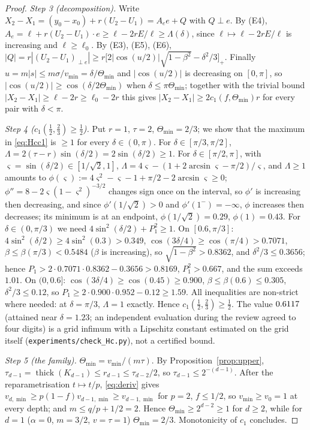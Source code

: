 \documentclass[10pt,a4paper]{article}
\theoremstyle{plain}
\theoremstyle{definition}
\theoremstyle{remark}
\newcommand{\thick}{\operatorname{thick}}
\begin{document}
\begin{proof}
\emph{Step 3 (decomposition).} Write $X_2-X_1=(y_0-x_0)+r(U_2-U_1)=A_ee+Q$ with $Q\perp e$. By (E4), $A_e=\ell+r(U_2-U_1)\cdot e\ge\ell-2rE/\ell\ge\Lambda(\delta)$, since $\ell\mapsto\ell-2rE/\ell$ is increasing and $\ell\ge\ell_0$. By (E3), (E5), (E6), $|Q|=r|(U_2-U_1)_{\perp e}|\ge r\bigl[2|\cos(u/2)|\sqrt{1-\beta^2}-\delta^2/3\bigr]_+$. Finally $u=m|s|\le m\sigma/v_{\min}=\delta/\Theta_{\min}$ and $|\cos(u/2)|$ is decreasing on $[0,\pi]$, so $|\cos(u/2)|\ge\cos(\delta/2\Theta_{\min})$ when $\delta\le\pi\Theta_{\min}$; together with the trivial bound $|X_2-X_1|\ge\ell-2r\ge\ell_0-2r$ this gives $|X_2-X_1|\ge2c_1(f,\Theta_{\min})r$ for every pair with $\delta<\pi$.

\emph{Step 4 ($c_1(\frac12,\frac23)\ge\frac12$).} Put $r=1$, $\tau=2$, $\Theta_{\min}=2/3$; we show that the maximum in \eqref{eq:Hcc1} is $\ge1$ for every $\delta\in(0,\pi)$. For $\delta\in[\pi/3,\pi/2]$, $\Lambda=2(\tau-r)\sin(\delta/2)=2\sin(\delta/2)\ge1$. For $\delta\in[\pi/2,\pi]$, with $\varsigma=\sin(\delta/2)\in[1/\sqrt2,1]$, $\Lambda=4\varsigma-(1+2\arcsin\varsigma-\pi/2)/\varsigma$, and $\Lambda\ge1$ amounts to $\phi(\varsigma):=4\varsigma^2-\varsigma-1+\pi/2-2\arcsin\varsigma\ge0$; $\phi''=8-2\varsigma(1-\varsigma^2)^{-3/2}$ changes sign once on the interval, so $\phi'$ is increasing then decreasing, and since $\phi'(1/\sqrt2)>0$ and $\phi'(1^-)=-\infty$, $\phi$ increases then decreases; its minimum is at an endpoint, $\phi(1/\sqrt2)=0.29$, $\phi(1)=0.43$. For $\delta\in(0,\pi/3)$ we need $4\sin^2(\delta/2)+P_1^2\ge1$. On $[0.6,\pi/3]$: $4\sin^2(\delta/2)\ge4\sin^2(0.3)>0.349$, $\cos(3\delta/4)\ge\cos(\pi/4)>0.7071$, $\beta\le\beta(\pi/3)<0.5484$ ($\beta$ is increasing), so $\sqrt{1-\beta^2}>0.8362$, and $\delta^2/3\le0.3656$; hence $P_1>2\cdot0.7071\cdot0.8362-0.3656>0.8169$, $P_1^2>0.667$, and the sum exceeds $1.01$. On $(0,0.6]$: $\cos(3\delta/4)\ge\cos(0.45)\ge0.900$, $\beta\le\beta(0.6)\le0.305$, $\delta^2/3\le0.12$, so $P_1\ge2\cdot0.900\cdot0.952-0.12\ge1.59$. All inequalities are non-strict where needed: at $\delta=\pi/3$, $\Lambda=1$ exactly. Hence $c_1(\frac12,\frac23)\ge\frac12$. The value $0.6117$ (attained near $\delta=1.23$; an independent evaluation during the review agreed to four digits) is a grid infimum with a Lipschitz constant estimated on the grid itself (\texttt{experiments/check\_Hc.py}), not a certified bound.

\emph{Step 5 (the family).} $\Theta_{\min}=v_{\min}/(m\tau)$. By Proposition~\ref{prop:upper}, $\tau_{d-1}=\thick(K_{d-1})\le r_{d-1}\le\tau_{d-2}/2$, so $\tau_{d-1}\le2^{-(d-1)}$. After the reparametrisation $t\mapsto t/p$, \eqref{eq:deriv} gives $v_{d,\min}\ge p(1-f)v_{d-1,\min}\ge v_{d-1,\min}$ for $p=2$, $f\le1/2$, so $v_{\min}\ge v_0=1$ at every depth; and $m\le q/p+1/2=2$. Hence $\Theta_{\min}\ge2^{d-2}\ge1$ for $d\ge2$, while for $d=1$ ($\alpha=0$, $m=3/2$, $v=\tau=1$) $\Theta_{\min}=2/3$. Monotonicity of $c_1$ concludes.
\end{proof}
\end{document}
